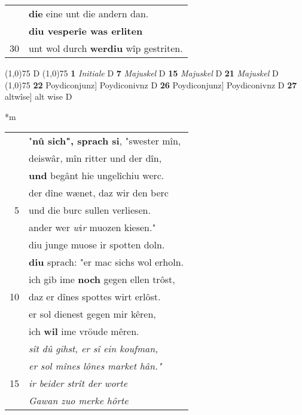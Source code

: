 \documentclass[8pt,a4paper,notitlepage]{article}
\begin{document}
\begin{table}[ht]
\begin{minipage}[t]{0.5\linewidth}
\begin{tabular}{rl}
 & \textbf{die} eine unt die andern dan.\\ 
 & \textbf{diu vesperîe was erliten}\\ 
30 & unt wol durch \textbf{werdiu} wîp gestriten.\\ 
\end{tabular}
\scriptsize
\line(1,0){75} \newline
D \newline
\line(1,0){75} \newline
\textbf{1} \textit{Initiale} D  \textbf{7} \textit{Majuskel} D  \textbf{15} \textit{Majuskel} D  \textbf{21} \textit{Majuskel} D  \newline
\line(1,0){75} \newline
\textbf{22} Poydiconjunz] Poydiconivnz D \textbf{26} Poydiconjunz] Poydiconivnz D \textbf{27} altwîse] alt wise D \newline
\end{minipage}
\hspace{0.5cm}
\begin{minipage}[t]{0.5\linewidth}
\small
\begin{center}*m
\end{center}
\begin{tabular}{rl}
 & "\textbf{nû sich", sprach si}, "swester mîn,\\ 
 & deiswâr, mîn ritter und der dîn,\\ 
 & \textbf{und} begânt hie ungelîchiu werc.\\ 
 & der dîne wænet, daz wir den berc\\ 
5 & und die burc sullen verliesen.\\ 
 & ander wer \textit{w}i\textit{r} muozen kiesen."\\ 
 & diu junge muose ir spotten doln.\\ 
 & \textbf{diu} sprach: "er mac sichs wol erholn.\\ 
 & ich gib ime \textbf{noch} gegen ellen trôst,\\ 
10 & daz er dînes spottes wirt erlôst.\\ 
 & er sol dienest gegen mir kêren,\\ 
 & ich \textbf{wil} ime vröude mêren.\\ 
 & \textit{sît dû gihst, er sî ein koufman,}\\ 
 & \textit{er sol mînes lônes market hân."}\\ 
15 & \textit{ir beider strît der worte}\\ 
 & \textit{Gawan zuo merke hôrte}\\ 

\end{tabular}
\end{minipage}
\end{table}
\end{document}
